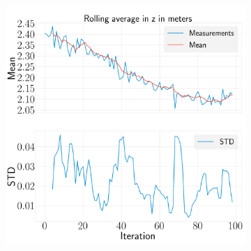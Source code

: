 \documentclass[../Head/report.tex]{subfiles}
\begin{document}
\begin{figure}[H]
\begin{subfigure}[t]{.30\textwidth}
        \caption{}
        \label{fig:rolling_average_in_y_test1}
    \end{subfigure}
     \hspace{0.2em}
    \begin{subfigure}[t]{.30\textwidth}
        \centering
        \includegraphics[width=\textwidth]{../Figures/analyse_rolling_average/test1/Calculated_rolling_average_in_z_with_mean_and_STD.png}
        \caption{}
        \label{fig:rolling_average_in_z_test1}
    \end{subfigure}
    \caption{}
    \label{fig:rolling_average_pos_test1}
\end{figure}
\end{document}
